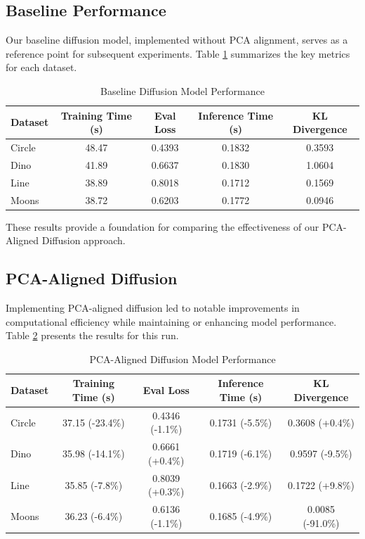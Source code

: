 \documentclass{article} %
\begin{document}
\subsection{Baseline Performance}
Our baseline diffusion model, implemented without PCA alignment, serves as a reference point for subsequent experiments. Table \ref{tab:baseline} summarizes the key metrics for each dataset.

\begin{table}[h]
\centering
\caption{Baseline Diffusion Model Performance}
\label{tab:baseline}
\begin{tabular}{lcccc}
\hline
Dataset & Training Time (s) & Eval Loss & Inference Time (s) & KL Divergence \\
\hline
Circle & 48.47 & 0.4393 & 0.1832 & 0.3593 \\
Dino & 41.89 & 0.6637 & 0.1830 & 1.0604 \\
Line & 38.89 & 0.8018 & 0.1712 & 0.1569 \\
Moons & 38.72 & 0.6203 & 0.1772 & 0.0946 \\
\hline
\end{tabular}
\end{table}

These results provide a foundation for comparing the effectiveness of our PCA-Aligned Diffusion approach.

\subsection{PCA-Aligned Diffusion}
Implementing PCA-aligned diffusion led to notable improvements in computational efficiency while maintaining or enhancing model performance. Table \ref{tab:pca_aligned} presents the results for this run.

\begin{table}[h]
\centering
\caption{PCA-Aligned Diffusion Model Performance}
\label{tab:pca_aligned}
\begin{tabular}{lcccc}
\hline
Dataset & Training Time (s) & Eval Loss & Inference Time (s) & KL Divergence \\
\hline
Circle & 37.15 (-23.4\%) & 0.4346 (-1.1\%) & 0.1731 (-5.5\%) & 0.3608 (+0.4\%) \\
Dino & 35.98 (-14.1\%) & 0.6661 (+0.4\%) & 0.1719 (-6.1\%) & 0.9597 (-9.5\%) \\
Line & 35.85 (-7.8\%) & 0.8039 (+0.3\%) & 0.1663 (-2.9\%) & 0.1722 (+9.8\%) \\
Moons & 36.23 (-6.4\%) & 0.6136 (-1.1\%) & 0.1685 (-4.9\%) & 0.0085 (-91.0\%) \\
\hline
\end{tabular}
\end{table}
\end{document}
